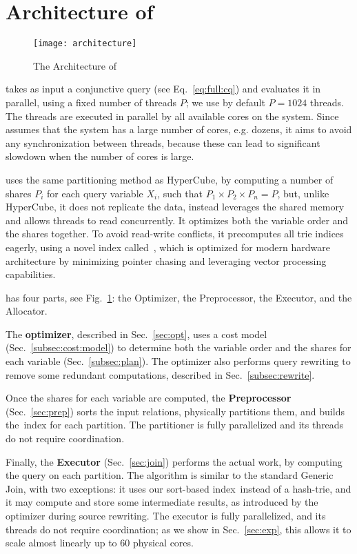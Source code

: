 \section{Architecture of \name}

\begin{figure}[t]
	\texttt{[image: architecture]}
	\caption{The Architecture of \name} 
	\label{fig:arch}
\end{figure}

\name takes as input a conjunctive query (see Eq.~\eqref{eq:full:cq})
and evaluates it in parallel, using a fixed number of threads $P$; we
use by default $P=1024$ threads.  The threads are executed in parallel
by all available cores on the system.  Since \name assumes that the
system has a large number of cores, e.g.  dozens, it aims to avoid any
synchronization between threads, because these can lead to significant
slowdown when the number of cores is large.  

\name uses the same
partitioning method as HyperCube, by computing a number of shares
$P_i$ for each query variable $X_i$, such that
$P_1 \times P_2 \times P_n=P$, but, unlike HyperCube, it does not
replicate the data, instead leverages the shared memory and allows
threads to read concurrently.  It optimizes both the variable order
and the shares together.  To avoid read-write conflicts, it
precomputes all trie indices eagerly, using a novel index
called~\indexlayout, which is optimized for modern hardware
architecture by minimizing pointer chasing and leveraging vector
processing capabilities.  

\name has four parts, see Fig.~\ref{fig:arch}: the Optimizer, the
Preprocessor, the Executor, and the Allocator.

The \textbf{optimizer}, described in Sec.~\ref{sec:opt}, uses a cost
model (Sec.~\ref{subsec:cost:model}) to determine both the variable
order and the shares for each variable (Sec.~\ref{subsec:plan}).  The
optimizer also performs query rewriting to remove some redundant
computations, described in Sec.~\ref{subsec:rewrite}.

Once the shares for each variable are computed, the
\textbf{Preprocessor} (Sec.~\ref{sec:prep}) sorts the input relations,
physically partitions them, and builds the~\indexlayout index for each
partition.  The partitioner is fully parallelized and its threads do
not require coordination.

Finally, the \textbf{Executor} (Sec.~\ref{sec:join}) performs the
actual work, by computing the query on each partition.  The algorithm
is similar to the standard Generic Join, with two exceptions: it uses
our sort-based index~\indexlayout instead of a hash-trie, and it may
compute and store some intermediate results, as introduced by the
optimizer during source rewriting. The executor is fully parallelized,
and its threads do not require coordination; as we show in
Sec.~\ref{sec:exp}, this allows it to scale almost linearly up to 60
physical cores.

